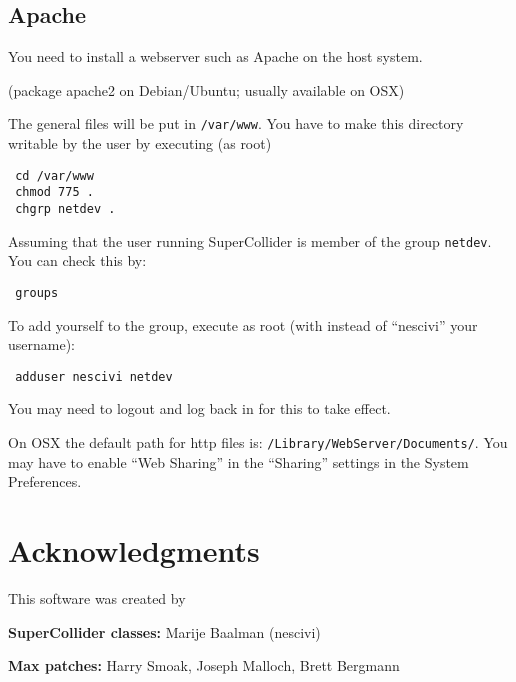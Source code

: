 \documentclass[letterpaper,10pt]{article}
\begin{document}
\subsection{Apache}

You need to install a webserver such as Apache on the host system.

(package apache2 on Debian/Ubuntu; usually available on OSX)

The general files will be put in \verb|/var/www|.
You have to make this directory writable by the user by executing (as root)

\begin{verbatim}
 cd /var/www
 chmod 775 .
 chgrp netdev .
\end{verbatim}

Assuming that the user running SuperCollider is member of the group \verb|netdev|. You can check this by:

\begin{verbatim}
 groups
\end{verbatim}

To add yourself to the group, execute as root (with instead of ``nescivi'' your username):
\begin{verbatim}
 adduser nescivi netdev
\end{verbatim}

You may need to logout and log back in for this to take effect.

On OSX the default path for http files is: \verb|/Library/WebServer/Documents/|. You may have to enable ``Web Sharing'' in the ``Sharing'' settings in the System Preferences.



\section*{Acknowledgments}\label{sec:acknowledgments}
This software was created by

\textbf{SuperCollider classes:}
Marije Baalman (nescivi)  

\textbf{Max patches:}
Harry Smoak, 
Joseph Malloch, 
Brett Bergmann
\end{document}
